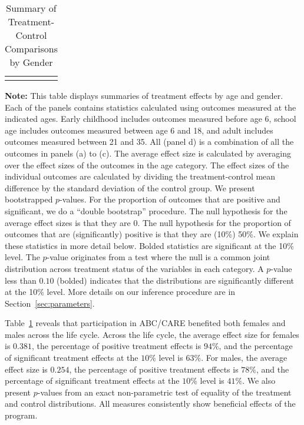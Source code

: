 \begin{table}[!htpb]
\begin{threeparttable}
\caption{Summary of Treatment-Control Comparisons by Gender} \label{table:summary}
\centering 
\begin{tabularx}{16.5cm}{XcX}
&  & 
\end{tabularx}
\begin{tablenotes}
\footnotesize
\item \textbf{Note:} This table displays summaries of treatment effects by age and gender. Each of the panels contains statistics calculated using outcomes measured at the indicated ages. Early childhood includes outcomes measured before age 6, school age includes outcomes measured between age 6 and 18, and adult includes outcomes measured between 21 and 35. All (panel d) is a combination of all the outcomes in panels (a) to (c). The average effect size is calculated by averaging over the effect sizes of the outcomes in the age category. The effect sizes of the individual outcomes are calculated by dividing the treatment-control mean difference by the standard deviation of the control group. We present bootstrapped $p$-values. For the proportion of outcomes that are positive and significant, we do a ``double bootstrap'' procedure. The null hypothesis for the average effect sizes is that they are 0. The null hypothesis for the proportion of outcomes that are (significantly) positive is that they are (10\%) 50\%. We explain these statistics in more detail below. Bolded statistics are significant at the 10\% level. The \citet{Rosenbaum_2005_Distribution_JRSS} $p$-value originates from a test where the null is a common joint distribution  across treatment status of the variables in each category. A $p$-value less than $0.10$ (bolded) indicates that the distributions are significantly different at the 10\% level. More details on our inference procedure are in Section~\ref{sec:parameters}.
\end{tablenotes}
\end{threeparttable}
\end{table}

Table~\ref{table:summary} reveals that participation in ABC/CARE benefited both females and males across the life cycle. Across the life cycle, the average effect size for females is $0.381$, the percentage of positive treatment effects is $94\%$, and the percentage of significant treatment effects at the $10\%$ level is $63\%$. For males, the average effect size is $0.254$, the percentage of positive treatment effects is $78\%$, and the percentage of significant treatment effects at the $10\%$ level is $41\%$. We also present $p$-values from an exact non-parametric test of equality of the treatment and control distributions. All measures consistently show beneficial effects of the program. 

